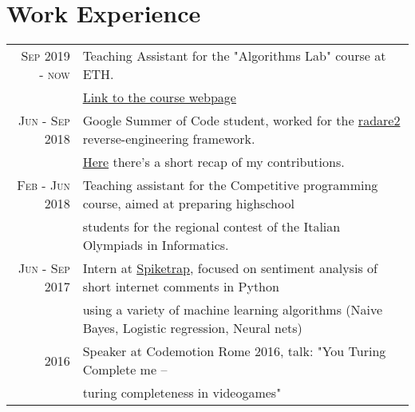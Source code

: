 \documentclass[a4paper,10pt]{article} %
\begin{document}
\section{Work Experience}
	\begin{tabular}{rl}
		\textsc{Sep 2019 - now}  & Teaching Assistant for the "Algorithms Lab" course at ETH. \\
		 & \href{https://www.cadmo.ethz.ch/education/lectures/HS19/algolab/index.html}{Link to the course webpage} \\
		\textsc{Jun - Sep  2018}  & Google Summer of Code student, worked for the \href{http://beta.rada.re/en/latest/}{radare2} reverse-engineering
		framework.\\
		 & \href{https://gist.github.com/cyanpencil/27db326bf6f9d2747297fa9b943eb65b#file-gsoc_report_final-md}{Here} there's a short recap of my contributions.  \\
	\textsc{Feb - Jun  2018}  & Teaching assistant for the Competitive programming course, aimed at preparing highschool \\
		 & students for the regional contest of the Italian Olympiads in Informatics.  \\
		\textsc{Jun - Sep  2017} & Intern at \href{http://www.spiketrap.io/}{Spiketrap}, focused on sentiment analysis of short internet comments in Python\\
		 & using a variety of machine learning algorithms (Naive Bayes, Logistic regression, Neural nets) \\
		2016 & Speaker at Codemotion Rome 2016, talk: "You Turing Complete me – \\
		 & turing completeness in videogames"\\
	\end{tabular}

\bigskip

\end{document}
